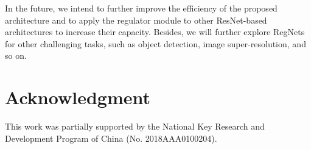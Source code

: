 \documentclass[journal,comsoc]{IEEEtran}
\begin{document}
In the future, we intend to further improve the efficiency of the proposed architecture and to apply the regulator module to other ResNet-based architectures \cite{DBLP:journals/corr/ZagoruykoK16,DBLP:journals/corr/SzegedyIV16,DBLP:journals/corr/XieGDTH16} to increase their capacity. Besides, we will further explore RegNets for other challenging tasks, such as object detection\cite{DBLP:journals/corr/RenHG015,DBLP:journals/corr/abs-1708-02002}, image super-resolution\cite{DBLP:journals/corr/LedigTHCATTWS16,Lim_2017_CVPR_Workshops}, and so on. 












\section*{Acknowledgment}

This work was partially supported by the National Key Research and Development Program of China (No. 2018AAA0100204).

\ifCLASSOPTIONcaptionsoff
  \newpage
\fi









\end{document}
